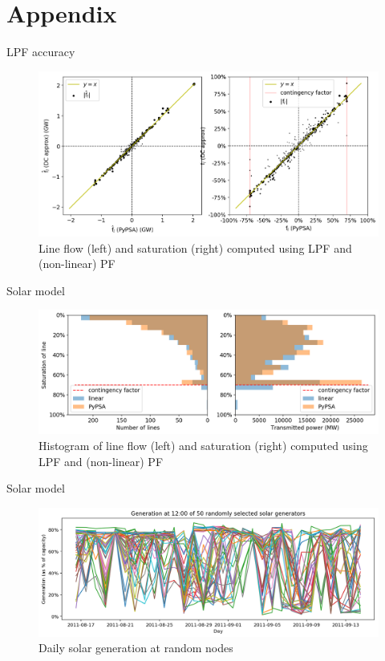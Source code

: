 \documentclass[10pt]{beamer}
\begin{document}
\appendix


\section{Appendix}

\begin{frame}{LPF accuracy}
    \begin{figure}
        \centering
        \includegraphics[width=\textwidth]{img/lineflowcorr.png}
        \caption{Line flow (left) and saturation (right) computed using LPF and (non-linear) PF}
    \end{figure}
\end{frame}
\begin{frame}{Solar model}
    \begin{figure}
        \centering
        \includegraphics[width=\textwidth]{img/saturationhistrot.png}
        \caption{Histogram of line flow (left) and saturation (right) computed using LPF and (non-linear) PF}
    \end{figure}
\end{frame}

\begin{frame}{Solar model}
    \begin{figure}
        \centering
        \includegraphics[width=\textwidth]{img/genprofilerandom.png}
        \caption{Daily solar generation at random nodes}
        \label{fig:genprofilerandom}
    \end{figure}
\end{frame}
\end{document}

